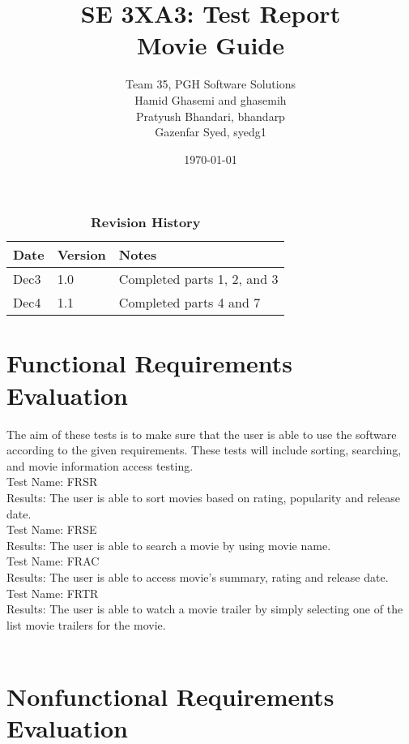 \documentclass[12pt, titlepage]{article}
\title{SE 3XA3: Test Report\\Movie Guide}
\author{Team 35, PGH Software Solutions
		\\ Hamid Ghasemi and ghasemih
		\\ Pratyush Bhandari, bhandarp
		\\ Gazenfar Syed, syedg1
}
\date{\today}
\begin{document}
\maketitle

\tableofcontents
\listoftables

\begin{table}[bp]
\caption{\bf Revision History}
\begin{tabularx}{\textwidth}{p{3cm}p{2cm}X}
\toprule {\bf Date} & {\bf Version} & {\bf Notes}\\
\midrule
Dec3 & 1.0 & Completed parts 1, 2, and 3\\
Dec4 & 1.1 & Completed parts 4 and 7\\
\bottomrule
\end{tabularx}
\end{table}

\newpage


\section{Functional Requirements Evaluation}
The aim of these tests is to make sure that the user is able to use the software according to the given requirements. These tests will include sorting, searching, and movie information access testing.\\

Test Name: FRSR \\
Results: The user is able to sort movies based on rating, popularity and release date. \\ 

Test Name: FRSE \\
Results: The user is able to search a movie by using movie name. \\ 

Test Name: FRAC \\
Results: The user is able to access movie's summary, rating and release date.\\ 

Test Name: FRTR\\
Results: The user is able to watch a movie trailer by simply selecting one of the list movie trailers for the movie. \\ \\

\section{Nonfunctional Requirements Evaluation}
\end{document}

